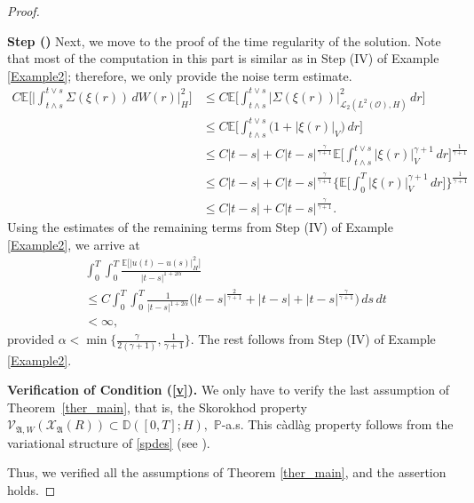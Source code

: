 \documentclass[english,a4paper,11pt]{amsart}
\theoremstyle{plain}
\theoremstyle{definition}
\theoremstyle{remark}
\numberwithin{equation}{section}
\newcounter{lil1}
\newenvironment{step}
{\begin{list} { \bf Step (\Roman{lil1})}
		{ \usecounter{lil1}
			\setlength{\leftmargin}{0.0cm}
			\setlength{\topsep}{0.2cm}
			\setlength{\itemsep}{0.0cm}
			\setlength{\parsep}{0.1cm}
			\setlength{\itemindent}{0.8cm}
			\setlength{\parskip}{0.0cm}}}
	{\end{list}}
\newcounter{lil33}
\newcounter{lil1q}
\newcommand{\EE}{ \mathbb{E} }
\newcommand{\Vcal} {{\mathcal V}}
\newcommand{\Xcal} {{\mathcal X}}
\newcommand{\Afrak} {{\mathfrak A}}
\renewcommand{\P}{\mathbb{P}}
\newcommand{\D}{\mathbb{D}}
\begin{document}
\begin{proof}
\begin{step}
{
Next, we move to the proof of the time regularity of the solution. Note that most of the computation in this part is similar as in Step (IV) of Example \ref{Example2}; therefore, we only provide the noise term estimate. 
\begin{align*}
C\EE	\bigg[\bigg|\int_{t\wedge s}^{t\vee s} \Sigma(\xi(r))\, dW(r)\bigg|_{H}^2\bigg]& \leq C \EE\bigg[\int_{t\wedge s}^{t\vee s} |\Sigma(\xi(r))|_{\mathcal{L}_2(L^2(\mathcal{O}), H)}^2\, dr \bigg] 
\\& \nonumber \leq C \EE\bigg[\int_{t\wedge s}^{t\vee s} \big(1+|\xi(r)|_V\big)\, d r\bigg]
\\&\nonumber\leq C |t-s|+C|t-s|^{\frac{\gamma}{\gamma+1}} \EE\bigg[\int_{t\wedge s}^{t\vee s} |\xi(r)|_V^{\gamma+1}\,d r\bigg]^{\frac{1}{\gamma+1}}
\\&\leq  \nonumber C |t-s|+C|t-s|^{\frac{\gamma}{\gamma+1}} \bigg\{\EE\bigg[\int_{0}^T |\xi(r)|_V^{\gamma+1}\,d r\bigg]\bigg\}^{\frac{1}{\gamma+1}}
\\&\leq C|t-s|+C|t-s|^{\frac{\gamma}{\gamma+1}}.
\end{align*} Using the estimates of the remaining terms from  Step (IV) of Example \ref{Example2}, we arrive at 
\begin{align*}\label{324}\nonumber
	&\int_0^T \int_0^T \frac{\EE\big[|u(t)-u(s)|_H^2\big]}{|t-s|^{1+2\alpha}}	
	\\& \nonumber \leq C\int_0^T \int_0^T \frac{1}{|t-s|^{1+2\alpha }} \Big(|t-s|^{\frac{2}{\gamma+1}}+|t-s|+|t-s|^{\frac{\gamma}{\gamma+1}}  \Big)\, ds \, dt 
	\\& <\infty,
\end{align*}provided $\alpha<\min\big\{\frac{\gamma}{2(\gamma+1)}, \frac{1}{\gamma+1}\big\}$. The rest follows from Step (IV) of Example \ref{Example2}.}






\item 
\textbf{Verification of Condition (\ref{v}).} 
{We only have to verify the last assumption of Theorem~\ref{ther_main}, that is, the Skorokhod property  $\Vcal_{\Afrak,W}(\Xcal_{\Afrak}(R))\subset \D([0,T];H),$ $\P$-a.s. This c\`adl\`ag property follows from the variational structure of \eqref{spdes} (see \cite{KrylovRozovskii,weiroeckner}).}
\end{step}Thus, we verified all the assumptions of Theorem \ref{ther_main}, and the assertion holds.
\end{proof}
\end{document}
